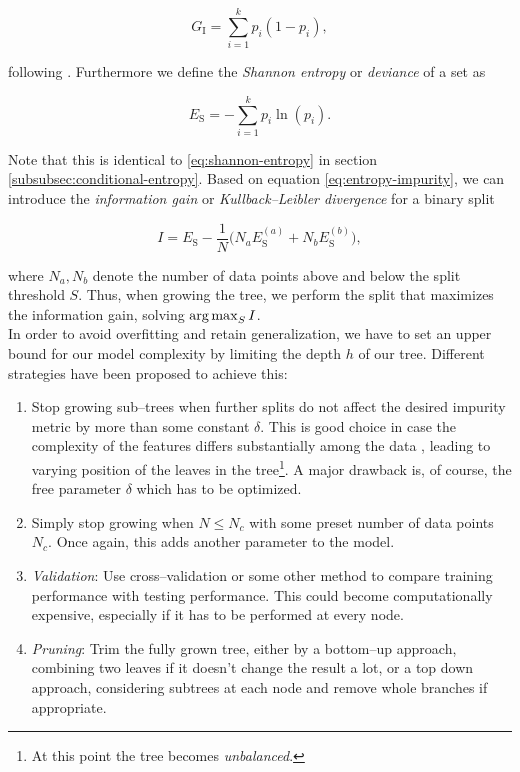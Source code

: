 \begin{equation}
\label{eq:gini-impurity}
G_{\text{I}} = \sum\limits_{i=1}^k p_i (1 - p_i),
\end{equation}

following \citet{astroML,hastie2001,ripley2007}. Furthermore we define the \emph{Shannon entropy} or \emph{deviance} of a set as

\begin{equation}
\label{eq:entropy-impurity}
E_{\text{S}} = - \sum\limits_{i=1}^k p_i \ln(p_i).
\end{equation}

Note that this is identical to \eqref{eq:shannon-entropy} in section \ref{subsubsec:conditional-entropy}. Based on equation \eqref{eq:entropy-impurity}, we can introduce the \emph{information gain} or \emph{Kullback--Leibler divergence} \citep{kullback1951} for a binary split

\begin{equation}
\label{eq:information-gain}
I = E_{\text{S}} - \frac{1}{N} \big(N_a E_{\text{S}}^{(a)} + N_b E_{\text{S}}^{(b)}\big),
\end{equation}

where $N_a, N_b$ denote the number of data points above and below the split threshold $S$. Thus, when growing the tree, we perform the split that maximizes the information gain, \ie solving $\operatorname*{arg\,max}_S I$.\\

In order to avoid overfitting and retain generalization, we have to set an upper bound for our model complexity by limiting the depth $h$ of our tree. Different strategies have been proposed to achieve this:

\begin{enumerate}
\item \label{itm:constant-metric} Stop growing sub--trees when further splits do not affect the desired impurity metric by more than some constant $\delta$. This is good choice in case the complexity of the features differs substantially among the data \citep{duda2001}, leading to varying position of the leaves in the tree\footnote{At this point the tree becomes \emph{unbalanced}.}. A major drawback is, of course, the free parameter $\delta$ which has to be optimized.
\item \label{itm:constant-data-points} Simply stop growing when $N \le N_c$ with some preset number of data points $N_c$. Once again, this adds another parameter to the model.
\item \label{itm:validation} \emph{Validation}: Use cross--validation or some other method to compare training performance with testing performance. This could become computationally expensive, especially if it has to be performed at every node.
\item \label{itm:pruning} \emph{Pruning}: Trim the fully grown tree, either by a bottom--up approach, \ie combining two leaves if it doesn't change the result a lot, or a top down approach, considering subtrees at each node and remove whole branches if appropriate.
\end{enumerate}

